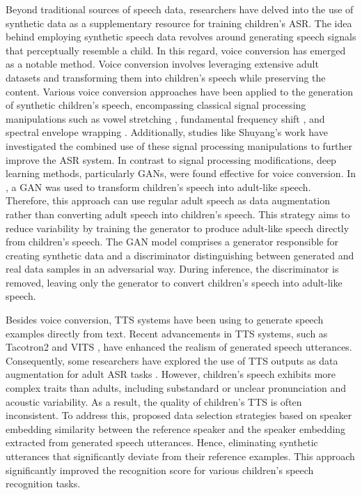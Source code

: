 Beyond traditional sources of speech data, researchers have delved into the use of synthetic data as a supplementary resource for training children's \ac{ASR}. The idea behind employing synthetic speech data revolves around generating speech signals that perceptually resemble a child. In this regard, voice conversion has emerged as a notable method. Voice conversion involves leveraging extensive adult datasets and transforming them into children's speech while preserving the content.
Various voice conversion approaches have been applied to the generation of synthetic children's speech, encompassing classical signal processing manipulations such as vowel stretching \cite{nagano2019data}, fundamental frequency shift \cite{yeung2021fundamental}, and spectral envelope wrapping \cite{dua2022spectral}. Additionally, studies like Shuyang's work \cite{shuyangdata} have investigated the combined use of these signal processing manipulations to further improve the \ac{ASR} system. In contrast to signal processing modifications, deep learning methods, particularly \acp{GAN}, were found effective for voice conversion. In \cite{GANS}, a \ac{GAN} was used to transform children's speech into adult-like speech. Therefore, this approach can use regular adult speech as data augmentation rather than converting adult speech into children's speech. This strategy aims to reduce variability by training the generator to produce adult-like speech directly from children's speech. The \ac{GAN} model comprises a generator responsible for creating synthetic data and a discriminator distinguishing between generated and real data samples in an adversarial way. During inference, the discriminator is removed, leaving only the generator to convert children's speech into adult-like speech.


Besides voice conversion, \ac{TTS} systems have been using to generate speech examples directly from text. Recent advancements in \ac{TTS} systems, such as Tacotron2 \cite{shen2018natural} and \ac{VITS} \cite{kim2021conditional}, have enhanced the realism of generated speech utterances. Consequently, some researchers have explored the use of \ac{TTS} outputs as data augmentation for adult \ac{ASR} tasks \cite{laptev2020you}. However, children's speech exhibits more complex traits than adults, including substandard or unclear pronunciation and acoustic variability. As a result, the quality of children's \ac{TTS} is often inconsistent. To address this, \cite{wang2021towards} proposed data selection strategies based on speaker embedding similarity between the reference speaker and the speaker embedding extracted from generated speech utterances. Hence, eliminating synthetic utterances that significantly deviate from their reference examples. This approach significantly improved the recognition score for various children's speech recognition tasks.

